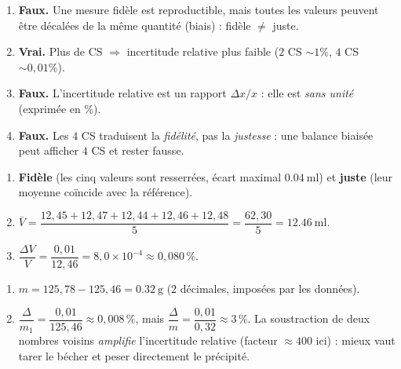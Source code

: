 \documentclass[11pt,a4paper]{article}
\begin{document}
\begin{corrige}
\begin{enumerate}[label=\alph*)]
  \item \textbf{Faux.} Une mesure fidèle est reproductible, mais toutes les valeurs peuvent être décalées
        de la même quantité (biais) : fidèle $\neq$ juste.
  \item \textbf{Vrai.} Plus de CS $\Rightarrow$ incertitude relative plus faible ($2$ CS $\sim1\%$,
        $4$ CS $\sim0,01\%$).
  \item \textbf{Faux.} L'incertitude relative est un rapport $\Delta x/x$ : elle est \emph{sans unité}
        (exprimée en \%).
  \item \textbf{Faux.} Les $4$ CS traduisent la \emph{fidélité}, pas la \emph{justesse} : une balance
        biaisée peut afficher $4$ CS et rester fausse.
\end{enumerate}
\end{corrige}

\begin{corrige}
\begin{enumerate}[label=\alph*)]
  \item \textbf{Fidèle} (les cinq valeurs sont resserrées, écart maximal $\qty{0,04}{\milli\litre}$) et
        \textbf{juste} (leur moyenne coïncide avec la référence).
  \item $\bar V=\dfrac{12,45+12,47+12,44+12,46+12,48}{5}=\dfrac{62,30}{5}=\qty{12,46}{\milli\litre}$.
  \item $\dfrac{\Delta V}{V}=\dfrac{0,01}{12,46}=8,0\times10^{-4}\approx\boxed{0,080\,\%}$.
\end{enumerate}
\end{corrige}

\begin{corrige}
\begin{enumerate}[label=\alph*)]
  \item $m=125,78-125,46=\boxed{\qty{0,32}{\gram}}$ ($2$ décimales, imposées par les données).
  \item $\dfrac{\Delta}{m_1}=\dfrac{0,01}{125,46}\approx 0,008\,\%$, mais
        $\dfrac{\Delta}{m}=\dfrac{0,01}{0,32}\approx \boxed{3\,\%}$. La soustraction de deux nombres voisins
        \emph{amplifie} l'incertitude relative (facteur $\approx 400$ ici) : mieux vaut tarer le bécher et
        peser directement le précipité.
\end{enumerate}
\end{corrige}
\end{document}
